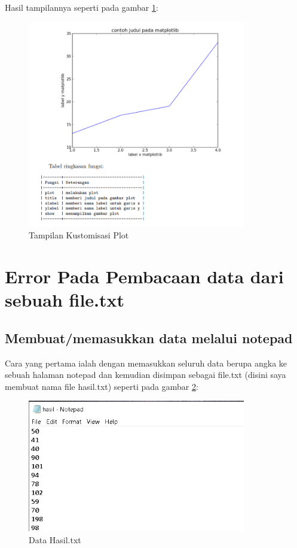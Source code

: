 Hasil tampilannya seperti pada gambar \ref{fig:showcp}:
\begin{figure}[!htbp]
	\centerline{\includegraphics[width=0.85\textwidth]{figures/6/showcp.PNG}}
	\caption{Tampilan Kustomisasi Plot}
	\label{fig:showcp}
\end{figure} 

\section{Error Pada Pembacaan data dari sebuah file.txt} 
\subsection{Membuat/memasukkan data melalui notepad}
Cara yang pertama ialah dengan memasukkan seluruh data berupa angka ke sebuah halaman notepad dan kemudian disimpan sebagai file.txt (disini saya membuat nama file hasil.txt) seperti pada gambar \ref{fig:datahasil}:
\begin{figure}[!htbp]
	\centerline{\includegraphics[width=0.85\textwidth]{figures/6/datahasil.PNG}}
	\caption{Data Hasil.txt}
	\label{fig:datahasil}
\end{figure} 

